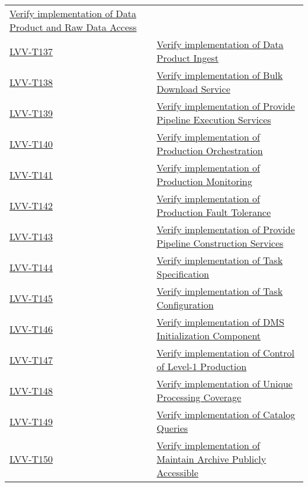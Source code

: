 \begin{longtable}[]{p{3cm}p{13cm}}
    \href{https://jira.lsstcorp.org/secure/Tests.jspa\#/testCase/LVV-T136}{Verify implementation of Data Product and Raw Data Access} \tabularnewline
    \hyperref[lvv-t137]{LVV-T137} &
    \href{https://jira.lsstcorp.org/secure/Tests.jspa\#/testCase/LVV-T137}{Verify implementation of Data Product Ingest} \tabularnewline
    \hyperref[lvv-t138]{LVV-T138} &
    \href{https://jira.lsstcorp.org/secure/Tests.jspa\#/testCase/LVV-T138}{Verify implementation of Bulk Download Service} \tabularnewline
    \hyperref[lvv-t139]{LVV-T139} &
    \href{https://jira.lsstcorp.org/secure/Tests.jspa\#/testCase/LVV-T139}{Verify implementation of Provide Pipeline Execution Services} \tabularnewline
    \hyperref[lvv-t140]{LVV-T140} &
    \href{https://jira.lsstcorp.org/secure/Tests.jspa\#/testCase/LVV-T140}{Verify implementation of Production Orchestration} \tabularnewline
    \hyperref[lvv-t141]{LVV-T141} &
    \href{https://jira.lsstcorp.org/secure/Tests.jspa\#/testCase/LVV-T141}{Verify implementation of Production Monitoring} \tabularnewline
    \hyperref[lvv-t142]{LVV-T142} &
    \href{https://jira.lsstcorp.org/secure/Tests.jspa\#/testCase/LVV-T142}{Verify implementation of Production Fault Tolerance} \tabularnewline
    \hyperref[lvv-t143]{LVV-T143} &
    \href{https://jira.lsstcorp.org/secure/Tests.jspa\#/testCase/LVV-T143}{Verify implementation of Provide Pipeline Construction Services} \tabularnewline
    \hyperref[lvv-t144]{LVV-T144} &
    \href{https://jira.lsstcorp.org/secure/Tests.jspa\#/testCase/LVV-T144}{Verify implementation of Task Specification} \tabularnewline
    \hyperref[lvv-t145]{LVV-T145} &
    \href{https://jira.lsstcorp.org/secure/Tests.jspa\#/testCase/LVV-T145}{Verify implementation of Task Configuration} \tabularnewline
    \hyperref[lvv-t146]{LVV-T146} &
    \href{https://jira.lsstcorp.org/secure/Tests.jspa\#/testCase/LVV-T146}{Verify implementation of DMS Initialization Component} \tabularnewline
    \hyperref[lvv-t147]{LVV-T147} &
    \href{https://jira.lsstcorp.org/secure/Tests.jspa\#/testCase/LVV-T147}{Verify implementation of Control of Level-1 Production} \tabularnewline
    \hyperref[lvv-t148]{LVV-T148} &
    \href{https://jira.lsstcorp.org/secure/Tests.jspa\#/testCase/LVV-T148}{Verify implementation of Unique Processing Coverage} \tabularnewline
    \hyperref[lvv-t149]{LVV-T149} &
    \href{https://jira.lsstcorp.org/secure/Tests.jspa\#/testCase/LVV-T149}{Verify implementation of Catalog Queries} \tabularnewline
    \hyperref[lvv-t150]{LVV-T150} &
    \href{https://jira.lsstcorp.org/secure/Tests.jspa\#/testCase/LVV-T150}{Verify implementation of Maintain Archive Publicly Accessible} \tabularnewline

\end{longtable}
